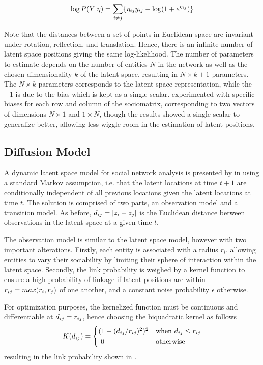         \begin{equation}\label{eq:lsm-log-likelihood}
            \log P(Y|\eta) = \sum_{i\neq j}\{ \sub(\eta)\sub(y) - \log(1+e^{\sub(\eta)}) \}
        \end{equation}
        
        Note that the distances between a set of points in Euclidean space are invariant under rotation, reflection, and translation. Hence, there is an infinite number of latent space positions giving the same log-likelihood. The number of parameters to estimate depends on the number of entities $N$ in the network as well as the chosen dimensionality $k$ of the latent space, resulting in $N \times k + 1$ parameters. The $N\times k$ parameters corresponds to the latent space representation, while the $+1$ is due to the bias which is kept as a single scalar. \citeauthor{jacobsen2018a} experimented with specific biases for each row and column of the sociomatrix, corresponding to two vectors of dimensions $N\times 1$ and $1\times N$, though the results showed a single scalar to generalize better, allowing less wiggle room in the estimation of latent positions.
        
    \subsection{Diffusion Model}
        
        A dynamic latent space model for social network analysis is presented by \citeauthor{sarkar2005dynamic} in \cite{sarkar2005dynamic} using a standard Markov assumption, i.e. that the latent locations at time $t+1$ are conditionally independent of all previous locations given the latent locations at time $t$. The solution is comprised of two parts, an observation model and a transition model. As before, $\sub(d)=|z_i-z_j|$ is the Euclidean distance between observations in the latent space at a given time $t$.
        
        The observation model is similar to the latent space model, however with two important alterations. Firstly, each entity is associated with a radius $r_i$, allowing entities to vary their sociability by limiting their sphere of interaction within the latent space.
        Secondly, the link probability is weighed by a kernel function to ensure a high probability of linkage if latent positions are within $\sub(r)=max(r_i,r_j)$ of one another, and a constant noise probability $\epsilon$ otherwise.
        
        For optimization purposes, the kernelized function must be continuous and differentiable at $\sub(d)=\sub(r)$, hence choosing the biquadratic kernel as follows
        \begin{equation}\label{eq:biquadratic-kernel}
            K(\sub(d))=
            \begin{cases}
                (1-(\sub(d)/\sub(r))^2)^2 & \text{when } \sub(d) \leq \sub(r) \\
                \ 0 & \text{otherwise}
            \end{cases}
        \end{equation}
        resulting in the link probability shown in .
        
